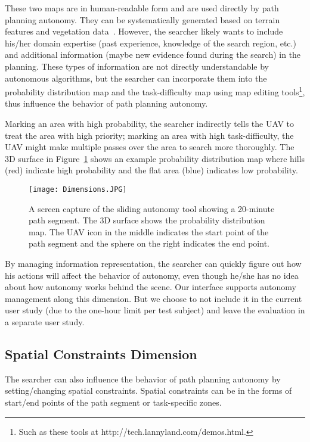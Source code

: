 These two maps are in human-readable form and are used directly by path planning autonomy. They can be systematically generated based on terrain features and vegetation data~\cite{Lin2010Bayesian, Lin2014Hierarchical}. However, the searcher likely wants to include his/her domain expertise (past experience, knowledge of the search region, etc.) and additional information (maybe new evidence found during the search) in the planning. These types of information are not directly understandable by autonomous algorithms, but the searcher can incorporate them into the probability distribution map and the task-difficulty map using map editing tools\footnote{Such as these tools at http://tech.lannyland.com/demos.html.}, thus influence the behavior of path planning autonomy.

Marking an area with high probability, the searcher indirectly tells the UAV to treat the area with high priority; marking an area with high task-difficulty, the UAV might make multiple passes over the area to search more thoroughly. The 3D surface in Figure~\ref{dimensions6} shows an example probability distribution map where hills (red) indicate high probability and the flat area (blue) indicates low probability.

\begin{figure}
\centering
\texttt{[image: Dimensions.JPG]}
\caption{A screen capture of the sliding autonomy tool showing a 20-minute path segment. The 3D surface shows the probability distribution map. The UAV icon in the middle indicates the start point of the path segment and the sphere on the right indicates the end point.}
\label{dimensions6}
\end{figure}

By managing information representation, the searcher can quickly figure out how his actions will affect the behavior of autonomy, even though he/she has no idea about how autonomy works behind the scene. Our interface supports autonomy management along this dimension. But we choose to not include it in the current user study (due to the one-hour limit per test subject) and leave the evaluation in a separate user study.

\subsection{Spatial Constraints Dimension}

The searcher can also influence the behavior of path planning autonomy by setting/changing spatial constraints. Spatial constraints can be in the forms of start/end points of the path segment or task-specific zones.

